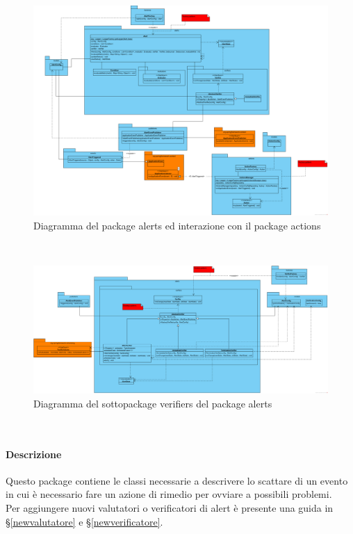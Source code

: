 		\begin{figure}[H]
			\centering
        	\includegraphics[width=\textwidth]{./img/DiagrammiClasse/alertToAction.png}
    	    \caption[Diagramma del package alerts]{Diagramma del package alerts ed interazione con il package actions}
		\end{figure}\\
       			
	    \begin{figure}[H]
    		\centering
        	\includegraphics[width=\textwidth]{./img/DiagrammiClasse/verifiers.png}
    	    \caption[Diagramma del sottopackage verifiers]
	        {Diagramma del sottopackage verifiers del package alerts}
		\end{figure}\\
		
		\paragraph*{Descrizione}
			Questo package contiene le classi necessarie a descrivere lo scattare di un evento in cui
			è necessario fare un azione di rimedio per ovviare a possibili problemi.\\
			Per aggiungere nuovi valutatori o verificatori di alert è presente una guida in §\ref{newvalutatore}
			e §\ref{newverificatore}.
		
